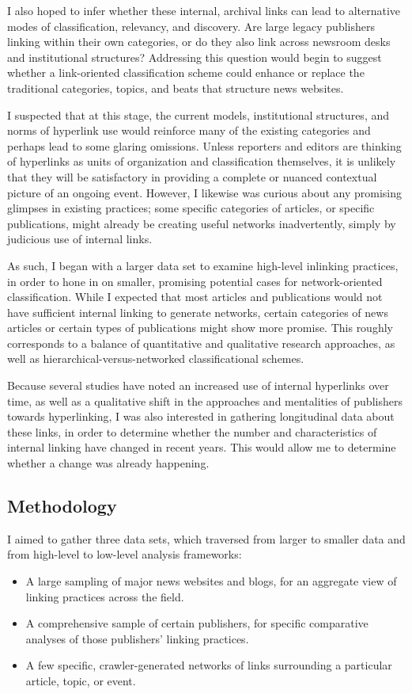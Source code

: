 I also hoped to infer whether these internal, archival links can lead to alternative modes of classification, relevancy, and discovery. Are large legacy publishers linking within their own categories, or do they also link across newsroom desks and institutional structures? Addressing this question would begin to suggest whether a link-oriented classification scheme could enhance or replace the traditional categories, topics, and beats that structure news websites.

I suspected that at this stage, the current models, institutional structures, and norms of hyperlink use would reinforce many of the existing categories and perhaps lead to some glaring omissions. Unless reporters and editors are thinking of hyperlinks as units of organization and classification themselves, it is unlikely that they will be satisfactory in providing a complete or nuanced contextual picture of an ongoing event. However, I likewise was curious about any promising glimpses in existing practices; some specific categories of articles, or specific publications, might already be creating useful networks inadvertently, simply by judicious use of internal links.

As such, I began with a larger data set to examine high-level inlinking practices, in order to hone in on smaller, promising potential cases for network-oriented classification. While I expected that most articles and publications would not have sufficient internal linking to generate networks, certain categories of news articles or certain types of publications might show more promise. This roughly corresponds to a balance of quantitative and qualitative research approaches, as well as hierarchical-versus-networked classificational schemes.

Because several studies have noted an increased use of internal hyperlinks over time, as well as a qualitative shift in the approaches and mentalities of publishers towards hyperlinking, I was also interested in gathering longitudinal data about these links, in order to determine whether the number and characteristics of internal linking have changed in recent years. This would allow me to determine whether a change was already happening.

\subsection{Methodology}

I aimed to gather three data sets, which traversed from larger to smaller data and from high-level to low-level analysis frameworks:\begin{itemize}
\item A large sampling of major news websites and blogs, for an aggregate view of linking practices across the field.
\item A comprehensive sample of certain publishers, for specific comparative analyses of those publishers' linking practices.
\item A few specific, crawler-generated networks of links surrounding a particular article, topic, or event.\end{itemize}

